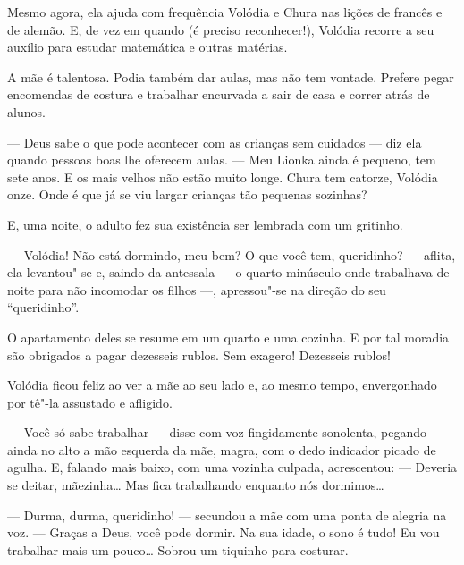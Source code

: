 Mesmo agora, ela ajuda com frequência Volódia e Chura nas lições de
francês e de alemão. E, de vez em quando (é preciso reconhecer!),
Volódia recorre a seu auxílio para estudar matemática e outras matérias.

A mãe é talentosa. Podia também dar aulas, mas não tem vontade. Prefere
pegar encomendas de costura e trabalhar encurvada a sair de casa e
correr atrás de alunos.

--- Deus sabe o que pode acontecer com as crianças sem cuidados --- diz
ela quando pessoas boas lhe oferecem aulas. --- Meu Lionka ainda é
pequeno, tem sete anos. E os mais velhos não estão muito longe. Chura
tem catorze, Volódia onze. Onde é que já se viu largar crianças
tão pequenas sozinhas?


E, uma noite, o adulto fez sua existência ser lembrada com um gritinho.

--- Volódia! Não está dormindo, meu bem? O que você tem, queridinho? ---
aflita, ela levantou"-se e, saindo da antessala --- o quarto minúsculo onde
trabalhava de noite para não incomodar os filhos ---, apressou"-se na direção do seu
``queridinho''.

O apartamento deles se resume em um quarto e uma cozinha. E por tal
moradia são obrigados a pagar dezesseis rublos. Sem exagero! Dezesseis
rublos!

Volódia ficou feliz ao ver a mãe ao seu lado e, ao mesmo tempo,
envergonhado por tê"-la assustado e afligido.

--- Você só sabe trabalhar --- disse com voz fingidamente sonolenta,
pegando ainda no alto a mão esquerda da mãe, magra, com o dedo indicador
picado de agulha. E, falando mais baixo, com uma vozinha culpada,
acrescentou: --- Deveria se deitar, mãezinha\ldots{} Mas fica trabalhando
enquanto nós dormimos\ldots{}

--- Durma, durma, queridinho! --- secundou a mãe com uma ponta de
alegria na voz. --- Graças a Deus, você pode dormir. Na sua idade, o
sono é tudo! Eu vou trabalhar mais um pouco\ldots{} Sobrou um
tiquinho para costurar.

